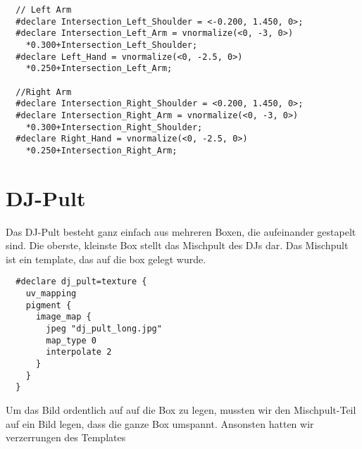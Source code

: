 \documentclass[paper=a4]{scrartcl}
\begin{document}
\begin{lstlisting}
  // Left Arm
  #declare Intersection_Left_Shoulder = <-0.200, 1.450, 0>;
  #declare Intersection_Left_Arm = vnormalize(<0, -3, 0>)
    *0.300+Intersection_Left_Shoulder;
  #declare Left_Hand = vnormalize(<0, -2.5, 0>)
    *0.250+Intersection_Left_Arm;

  //Right Arm
  #declare Intersection_Right_Shoulder = <0.200, 1.450, 0>;
  #declare Intersection_Right_Arm = vnormalize(<0, -3, 0>)
    *0.300+Intersection_Right_Shoulder;
  #declare Right_Hand = vnormalize(<0, -2.5, 0>)
    *0.250+Intersection_Right_Arm;
\end{lstlisting}


\section{DJ-Pult}
Das DJ-Pult besteht ganz einfach aus mehreren Boxen, die aufeinander gestapelt sind.
Die oberste, kleinste Box stellt das Mischpult des DJs dar. Das Mischpult ist ein template, das auf die box gelegt wurde.

\begin{lstlisting}
  #declare dj_pult=texture {
    uv_mapping
    pigment {
      image_map {
        jpeg "dj_pult_long.jpg"
        map_type 0
        interpolate 2
      }
    }
  }
\end{lstlisting}

Um das Bild ordentlich auf auf die Box zu legen, mussten wir den Mischpult-Teil auf ein Bild legen, dass die ganze Box umspannt.
Ansonsten hatten wir verzerrungen des Templates
\end{document}

